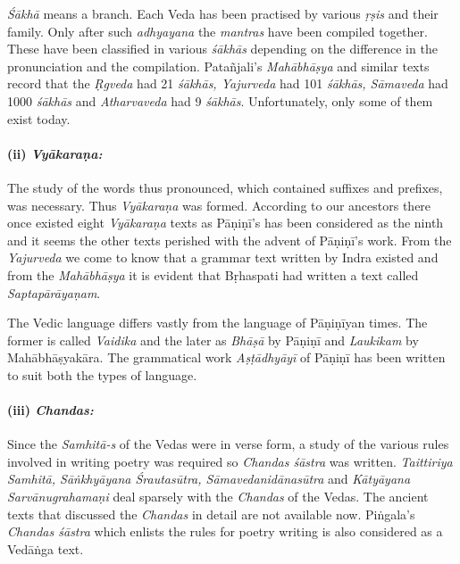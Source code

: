 \textit{Śākhā} means a branch. Each Veda has been practised by various \textit{ṛṣis} and their family. Only after such \textit{adhyayana} the \textit{mantras} have been compiled together. These have been classified in various \textit{śākhās} depending on the difference in the pronunciation and the compilation. Patañjali’s \textit{Mahābhāṣya} and similar texts record that the \textit{Ṛgveda} had 21 \textit{śākhās, Yajurveda} had 101 \textit{śākhās, Sāmaveda} had 1000 \textit{śākhās} and \textit{Atharvaveda} had 9 \textit{śākhās}. Unfortunately, only some of them exist today.


\paragraph*{(ii) \textit{Vyākaraṇa:}}

\vskip -7.3pt

The study of the words thus pronounced, which contained suffixes and prefixes, was necessary. Thus \textit{Vyākaraṇa} was formed. According to our ancestors there once existed eight \textit{Vyākaraṇa} texts as Pāṇiṇī’s has been considered as the ninth and it seems the other texts perished with the advent of Pāṇiṇī’s work. From the \textit{Yajurveda} we come to know that a grammar text written by Indra existed and from the \textit{Mahābhāṣya} it is evident that Bṛhaspati had written a text called \textit{Saptapārāyaṇam}.

The Vedic language differs vastly from the language of Pāṇiṇīyan times. The former is called \textit{Vaidika} and the later as \textit{Bhāṣā} by Pāṇiṇī and \textit{Laukikam} by Mahābhāṣyakāra. The grammatical work \textit{Aṣṭādhyāyī} of Pāṇiṇī has been written to suit both the types of language.


\paragraph*{(iii) \textit{Chandas:}}

\vskip -7.3pt

Since the \textit{Samhitā-s} of the Vedas were in verse form, a study of the various rules involved in writing poetry was required so \textit{Chandas śāstra} was written. \textit{Taittiriya Samhitā, Sāṅkhyāyana Śrautasūtra, Sāmavedanidānasūtra} and \textit{Kātyāyana Sarvānugrahamaṇi} deal sparsely with the \textit{Chandas} of the Vedas. The ancient texts that discussed the \textit{Chandas} in detail are not available now. Piṅgala’s \textit{Chandas śāstra} which enlists the rules for poetry writing is also considered as a Vedāṅga text.


